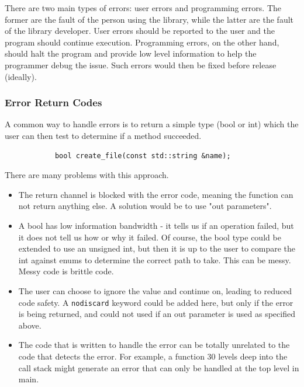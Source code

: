 \documentclass[12pt]{report}
\theoremstyle{definition}
\begin{document}
        There are two main types of errors: user errors and programming errors.
        The former are the fault of the person using the library, while the
        latter are the fault of the library developer. User errors should be
        reported to the user and the program should continue execution.
        Programming errors, on the other hand, should halt the program and
        provide low level information to help the programmer debug the
        issue. Such errors would then be fixed before release (ideally). \\

        \subsubsection{Error Return Codes}

          A common way to handle errors is to return a simple type (bool or int)
          which the user can then test to determine if a method succeeded.

          \vspace{5mm}
          \begin{lstlisting}
            bool create_file(const std::string &name);
          \end{lstlisting}
          \vspace{5mm}

          There are many problems with this approach.

          \begin{itemize}
            \item The return channel is blocked with the error code, meaning
              the function can not return anything else. A solution would be to
              use "out parameters".
            \item A bool has low information bandwidth - it tells us if an
              operation failed, but it does not tell us how or why it failed.
              Of course, the bool type could be extended to use an unsigned int,
              but then it is up to the user to compare the int against enums to
              determine the correct path to take. This can be messy. Messy code
              is brittle code.
            \item The user can choose to ignore the value and continue on,
              leading to reduced code safety. A \texttt{nodiscard} keyword could be
              added here, but only if the error is being returned, and could not used
              if an out parameter is used as specified above.
            \item The code that is written to handle the error can be totally
              unrelated to the code that detects the error. For example, a
              function 30 levels deep into the call stack might generate an
              error that can only be handled at the top level in main.
          \end{itemize}
\end{document}
